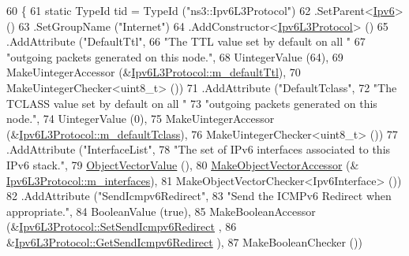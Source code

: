 \begin{DoxyCode}
60 \{
61   \textcolor{keyword}{static} TypeId tid = TypeId (\textcolor{stringliteral}{"ns3::Ipv6L3Protocol"})
62     .SetParent<\hyperlink{classns3_1_1Ipv6_adccc58acd14d3f9a28f75dc09e794998}{Ipv6}> ()
63     .SetGroupName (\textcolor{stringliteral}{"Internet"})
64     .AddConstructor<\hyperlink{classns3_1_1Ipv6L3Protocol_aed69fbc6c2eca9a88dfb50f12b419902}{Ipv6L3Protocol}> ()
65     .AddAttribute (\textcolor{stringliteral}{"DefaultTtl"},
66                    \textcolor{stringliteral}{"The TTL value set by default on all "}
67                    \textcolor{stringliteral}{"outgoing packets generated on this node."},
68                    UintegerValue (64),
69                    MakeUintegerAccessor (&\hyperlink{classns3_1_1Ipv6L3Protocol_a2857858d48a3ce4f6bc1912d721825b7}{Ipv6L3Protocol::m\_defaultTtl}),
70                    MakeUintegerChecker<uint8\_t> ())
71     .AddAttribute (\textcolor{stringliteral}{"DefaultTclass"},
72                    \textcolor{stringliteral}{"The TCLASS value set by default on all "}
73                    \textcolor{stringliteral}{"outgoing packets generated on this node."},
74                    UintegerValue (0),
75                    MakeUintegerAccessor (&\hyperlink{classns3_1_1Ipv6L3Protocol_a0ead80eb6fa685c54dc155dff9157345}{Ipv6L3Protocol::m\_defaultTclass}),
76                    MakeUintegerChecker<uint8\_t> ())
77     .AddAttribute (\textcolor{stringliteral}{"InterfaceList"},
78                    \textcolor{stringliteral}{"The set of IPv6 interfaces associated to this IPv6 stack."},
79                    \hyperlink{namespacens3_a5de726d8bcea7a51fd68ce5167a66713}{ObjectVectorValue} (),
80                    \hyperlink{namespacens3_a6ad5b3621a5dc72b7030cbb07c73adf6}{MakeObjectVectorAccessor} (&
      \hyperlink{classns3_1_1Ipv6L3Protocol_a425d8738fd30fbc9345d57cfddd0d6d0}{Ipv6L3Protocol::m\_interfaces}),
81                    MakeObjectVectorChecker<Ipv6Interface> ())
82     .AddAttribute (\textcolor{stringliteral}{"SendIcmpv6Redirect"},
83                    \textcolor{stringliteral}{"Send the ICMPv6 Redirect when appropriate."},
84                    BooleanValue (\textcolor{keyword}{true}),
85                    MakeBooleanAccessor (&\hyperlink{classns3_1_1Ipv6L3Protocol_aa5c6bd6e857b631c812ed5bbe4566241}{Ipv6L3Protocol::SetSendIcmpv6Redirect}
      ,
86                                         &\hyperlink{classns3_1_1Ipv6L3Protocol_a4445c0e64ff312aedff3c5644fd6e99d}{Ipv6L3Protocol::GetSendIcmpv6Redirect}
      ),
87                    MakeBooleanChecker ())

\end{DoxyCode}
